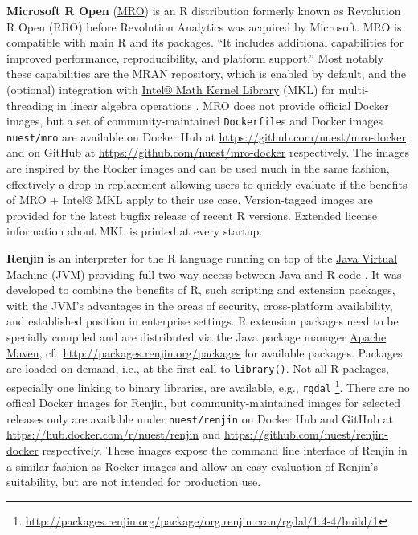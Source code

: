 \textbf{Microsoft R Open}
(\href{https://github.com/nuest/mro-docker}{MRO}) is an R distribution
formerly known as Revolution R Open (RRO) before Revolution Analytics
was acquired by Microsoft. MRO is compatible with main R and its
packages. ``It includes additional capabilities for improved
performance, reproducibility, and platform support.''
\citep{microsoft_mro} Most notably these capabilities are the MRAN
repository, which is enabled by default, and the (optional) integration
with \href{https://software.intel.com/en-us/mkl}{Intel® Math Kernel
Library} (MKL) for multi-threading in linear algebra operations
\citep{microsoft_multithread}. MRO does not provide official Docker
images, but a set of community-maintained \texttt{Dockerfile}s and
Docker images \texttt{nuest/mro} are available on Docker Hub at
\url{https://github.com/nuest/mro-docker} and on GitHub at
\url{https://github.com/nuest/mro-docker} respectively. The images are
inspired by the Rocker images and can be used much in the same fashion,
effectively a drop-in replacement allowing users to quickly evaluate if
the benefits of MRO + Intel® MKL apply to their use case. Version-tagged
images are provided for the latest bugfix release of recent R versions.
Extended license information about MKL is printed at every startup.

\textbf{Renjin} is an interpreter for the R language running on top of
the \href{https://en.wikipedia.org/wiki/Java_virtual_machine}{Java
Virtual Machine} (JVM) providing full two-way access between Java and R
code \citep{wikipedia_renjin_2018}. It was developed to combine the
benefits of R, such scripting and extension packages, with the JVM's
advantages in the areas of security, cross-platform availability, and
established position in enterprise settings. R extension packages need
to be specially compiled and are distributed via the Java package
manager \href{https://en.wikipedia.org/wiki/Apache_Maven}{Apache Maven},
cf.~\url{http://packages.renjin.org/packages} for available packages.
Packages are loaded on demand, i.e., at the first call to
\texttt{library()}. Not all R packages, especially one linking to binary
libraries, are available, e.g., \texttt{rgdal}
\footnote{\href{http://packages.renjin.org/package/org.renjin.cran/rgdal/1.4-4/build/1}{http://packages.renjin.org/package/org.renjin.cran/rgdal/1.4-4/build/1}}.
There are no offical Docker images for Renjin, but community-maintained
images for selected releases only are available under
\texttt{nuest/renjin} on Docker Hub and GitHub at
\url{https://hub.docker.com/r/nuest/renjin} and
\url{https://github.com/nuest/renjin-docker} respectively. These images
expose the command line interface of Renjin in a similar fashion as
Rocker images and allow an easy evaluation of Renjin's suitability, but
are not intended for production use.

